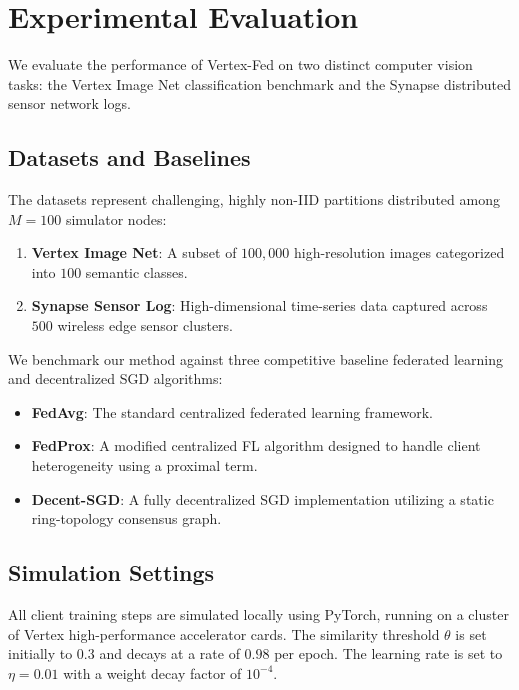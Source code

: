 \section{Experimental Evaluation}
\label{sec:exp}
We evaluate the performance of Vertex-Fed on two distinct computer vision tasks: the Vertex Image Net classification benchmark and the Synapse distributed sensor network logs.

\subsection{Datasets and Baselines}
The datasets represent challenging, highly non-IID partitions distributed among $M=100$ simulator nodes:
\begin{enumerate}
    \item \textbf{Vertex Image Net}: A subset of $100{,}000$ high-resolution images categorized into $100$ semantic classes.
    \item \textbf{Synapse Sensor Log}: High-dimensional time-series data captured across $500$ wireless edge sensor clusters.
\end{enumerate}

We benchmark our method against three competitive baseline federated learning and decentralized SGD algorithms:
\begin{itemize}
    \item \textbf{FedAvg}: The standard centralized federated learning framework.
    \item \textbf{FedProx}: A modified centralized FL algorithm designed to handle client heterogeneity using a proximal term.
    \item \textbf{Decent-SGD}: A fully decentralized SGD implementation utilizing a static ring-topology consensus graph.
\end{itemize}

\subsection{Simulation Settings}
All client training steps are simulated locally using PyTorch, running on a cluster of Vertex high-performance accelerator cards. The similarity threshold $\theta$ is set initially to $0.3$ and decays at a rate of $0.98$ per epoch. The learning rate is set to $\eta = 0.01$ with a weight decay factor of $10^{-4}$.
